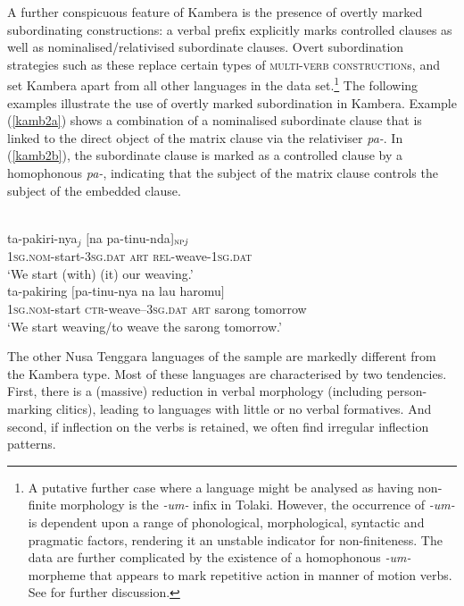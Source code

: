 A further conspicuous feature of Kambera is the presence of overtly marked subordinating constructions: a verbal prefix explicitly marks controlled clauses as well as nominalised/relativised subordinate clauses. Overt subordination strat\-e\-gies such as these replace certain types of \textsc{multi-verb construction}s, and set Kambera apart from all other languages in the data set.\footnote{A putative further case where a language might be analysed as having non-finite morphology is the \textit{-um-} infix in Tolaki. However, the occurrence of \textit{-um-} is dependent upon a range of phonological, morphological, syntactic and pragmatic factors, rendering it an unstable indicator for non-finiteness. The data are further complicated by the existence of a homophonous \textit{-um-} morpheme that appears to mark repetitive action in manner of motion verbs. See \citet[117]{mead2008verb} for further discussion.} The following examples illustrate the use of overtly marked subordination in Kambera. Example (\ref{kamb2a}) shows a combination of a nominalised subordinate clause that is linked to the direct object of the matrix clause via the relativiser \textit{pa-}. In (\ref{kamb2b}), the subordinate clause is marked as a controlled clause by a homophonous \textit{pa-}, indicating that the subject of the matrix clause controls the subject of the embedded clause.

\ea 
{}\\
\ea \label{kamb2a}
\gll ta-pakiri-nya$_j$ $[$na pa-tinu-nda$]_{\textsc{np} \textit{j}}$ \\
\textsc{1}\textsc{sg}.\textsc{nom}-start-\textsc{3}\textsc{sg}.\textsc{dat} \textsc{art} \textsc{rel}-weave-\textsc{1}\textsc{sg}.\textsc{dat} \\
\glft `We start (with) (it) our weaving.' \\ 
\ex \label{kamb2b}
\gll ta-pakiring $[$pa-tinu-nya na lau haromu$]$ \\ 
\textsc{1}\textsc{sg}.\textsc{nom}-start \textsc{ctr}-weave--\textsc{3}\textsc{sg}.\textsc{dat} \textsc{art} sarong tomorrow \\
\glft `We start weaving/to weave the sarong tomorrow.'\\ 
\z
\z

The other Nusa Tenggara languages of the sample are markedly different from the Kambera type. Most of these languages are characterised by two tendencies. First, there is a (massive) reduction in verbal morphology (including person-marking clitics), leading to languages with little or no verbal formatives. And second, if inflection on the verbs is retained, we often find irregular inflection patterns. 

